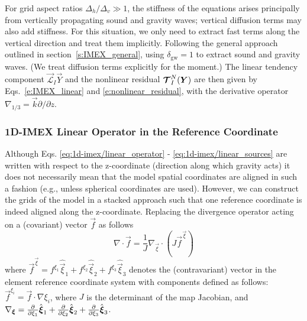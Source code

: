 \documentclass{report}
\begin{document}
{For grid aspect ratios $\Delta_h/\Delta_v \gg 1$, the stiffness of the equations arises principally from vertically propagating sound and gravity waves; vertical diffusion terms may also add stiffness. For this situation, we only need to extract fast terms along the vertical direction and treat them implicitly.  Following the general approach outlined in section~\ref{s:IMEX_general}, using $\delta_{\mathrm{gw}}=1$ to extract sound and gravity waves. (We treat diffusion terms explicitly for the moment.) The linear tendency component $\vec{\mathcal{L}}_I \vec{Y}$ and the nonlinear residual $\boldsymbol{{\mathcal{T}}}_I^N(\boldsymbol{{Y}})$ are then given by Eqs.~\eqref{e:IMEX_linear} and \eqref{e:nonlinear_residual}, with the derivative operator $\nabla_{1/3} = \vec{k} \partial/\partial z$.

\subsubsection{1D-IMEX Linear Operator in the Reference Coordinate}
 Although Eqs. \eqref{eq:1d-imex/linear_operator} -  \eqref{eq:1d-imex/linear_sources} are written with respect to the z-coordinate (direction along which gravity acts) it does not necessarily mean that the model spatial coordinates are aligned in such a fashion (e.g., unless spherical coordinates are used). However, we can construct the grids of the model in a stacked approach such that one reference coordinate is indeed aligned along the z-coordinate. 
 Replacing the divergence operator acting on a (covariant) vector $\vec{f}$ as follows
 \[
 \nabla \cdot \vec{f} = \frac{1}{J} \nabla_{\vec{\xi}} \cdot \left(J \vec{f}^{\vec{\xi}} \right)
 \]
 where $\vec{f}^{\vec{\xi}}=f^{\xi_1} \hat{\vec{\xi}}_1 + f^{\xi_2} \hat{\vec{\xi}}_2 + f^{\xi_3} \hat{\vec{\xi}}_3$ denotes the (contravariant) vector in the element reference coordinate system with components defined as follows:
 $\vec{f}^{\xi_i}=\vec{f} \cdot \nabla \xi_i$, where $J$ is the determinant of the map Jacobian, and 
 $\nabla_{\boldsymbol{{\xi}}}=\frac{\partial }{\partial \xi_1} \hat{\boldsymbol{{\xi}}}_1 + \frac{\partial }{\partial \xi_2} \hat{\boldsymbol{{\xi}}}_2 + \frac{\partial }{\partial \xi_3} \hat{\boldsymbol{{\xi}}}_3$. 
 
}
\end{document}
